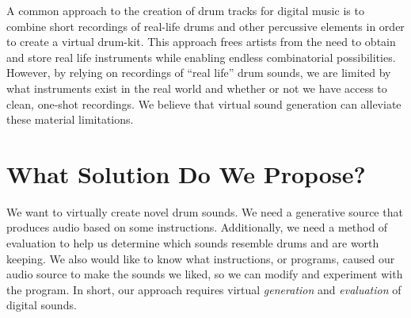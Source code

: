 \documentclass[\main/thesis.tex]{subfiles}
\begin{document}
A common approach to the creation of drum tracks for digital music is to combine short recordings of real-life drums and other percussive elements in order to create a virtual drum-kit. This approach frees artists from the need to obtain and store real life instruments while enabling endless combinatorial possibilities. However, by relying on recordings of \enquote{real life} drum sounds, we are limited by what instruments exist in the real world and whether or not we have access to clean, one-shot recordings. We believe that virtual sound generation can alleviate these material limitations. 
 
\section{What Solution Do We Propose?}
We want to virtually create novel drum sounds. We need a generative source that produces audio based on some instructions. Additionally, we need a method of evaluation to help us determine which sounds resemble drums and are worth keeping. We also would like to know what instructions, or programs, caused our audio source to make the sounds we liked, so we can modify and experiment with the program. In short, our approach requires virtual \textit{generation} and \textit{evaluation} of digital sounds.   
\end{document}
